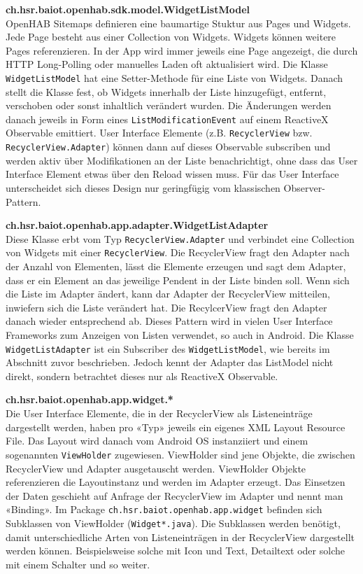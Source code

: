 \textbf{ch.hsr.baiot.openhab.sdk.model.WidgetListModel}\\
OpenHAB Sitemaps definieren eine baumartige Stuktur aus Pages und Widgets. Jede Page besteht aus einer Collection von Widgets. Widgets können weitere Pages referenzieren. In der App wird immer jeweils eine Page angezeigt, die durch HTTP Long-Polling oder manuelles Laden oft aktualisiert wird. Die Klasse \lstinline!WidgetListModel! hat eine Setter-Methode für eine Liste von Widgets. Danach stellt die Klasse fest, ob Widgets innerhalb der Liste hinzugefügt, entfernt, verschoben oder sonst inhaltlich verändert wurden. Die Änderungen werden danach jeweils in Form eines \lstinline!ListModificationEvent! auf einem ReactiveX Observable emittiert. User Interface Elemente (z.B. \lstinline!RecyclerView! bzw. \lstinline!RecyclerView.Adapter!) können dann auf dieses Observable subscriben und werden aktiv über Modifikationen an der Liste benachrichtigt, ohne dass das User Interface Element etwas über den Reload wissen muss. Für das User Interface unterscheidet sich dieses Design nur geringfügig vom klassischen Observer-Pattern. 

\textbf{ch.hsr.baiot.openhab.app.adapter.WidgetListAdapter}\\
Diese Klasse erbt vom Typ \lstinline!RecyclerView.Adapter! und verbindet eine Collection von Widgets mit einer \lstinline!RecyclerView!. Die RecyclerView fragt den Adapter nach der Anzahl von Elementen, lässt die Elemente erzeugen und sagt dem Adapter, dass er ein Element an das jeweilige Pendent in der Liste binden soll. Wenn sich die Liste im Adapter ändert, kann dar Adapter der RecyclerView mitteilen, inwiefern sich die Liste verändert hat. Die RecylcerView fragt den Adapter danach wieder entsprechend ab. Dieses Pattern wird in vielen User Interface Frameworks zum Anzeigen von Listen verwendet, so auch in Android. Die Klasse \lstinline!WidgetListAdapter! ist ein Subscriber des \lstinline!WidgetListModel!, wie bereits im Abschnitt zuvor beschrieben. Jedoch kennt der Adapter das ListModel nicht direkt, sondern betrachtet dieses nur als ReactiveX Observable.

\textbf{ch.hsr.baiot.openhab.app.widget.*}\\
Die User Interface Elemente, die in der RecyclerView als Listeneinträge dargestellt werden, haben pro «Typ» jeweils ein eigenes XML Layout Resource File. Das Layout wird danach vom Android OS instanziiert und einem sogenannten \lstinline!ViewHolder! zugewiesen. ViewHolder sind jene Objekte, die zwischen RecyclerView und Adapter ausgetauscht werden. ViewHolder Objekte referenzieren die Layoutinstanz und werden im Adapter erzeugt. Das Einsetzen der Daten geschieht auf Anfrage der RecyclerView im Adapter und nennt man «Binding». Im Package \lstinline!ch.hsr.baiot.openhab.app.widget! befinden sich Subklassen von ViewHolder (\lstinline!Widget*.java!). Die Subklassen werden benötigt, damit unterschiedliche Arten von Listeneinträgen in der RecyclerView dargestellt werden können. Beispielsweise solche mit Icon und Text, Detailtext oder solche mit einem Schalter und so weiter. 



